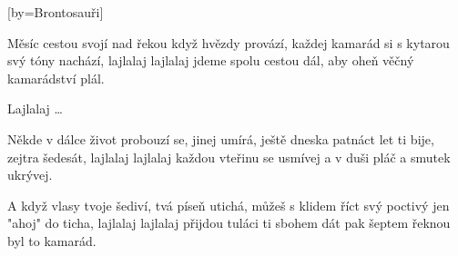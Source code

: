 [by={Brontosauři}]

\beginverse{}
Měsíc cestou svojí nad řekou když hvězdy provází,
každej kamarád si s kytarou svý tóny nachází,
lajlalaj lajlalaj
jdeme spolu cestou dál, aby oheň věčný kamarádství plál.
\endverse{}

\beginchorus{}
Lajlalaj \ldots{}        
\endchorus{}

\beginverse{}
Někde v dálce život probouzí se, jinej umírá,
ještě dneska patnáct let ti bije, zejtra šedesát,
lajlalaj lajlalaj
každou vteřinu se usmívej a v duši pláč a smutek ukrývej.
\endverse{}

\beginchorus{}

\endchorus{}

\beginverse{}
A když vlasy tvoje šediví, tvá píseň utichá,
můžeš s klidem říct svý poctivý jen "ahoj" do ticha,
lajlalaj lajlalaj
přijdou tuláci ti sbohem dát pak šeptem řeknou byl to kamarád.
\endverse{}

\beginchorus{}

\endchorus{}

\endsong{}
